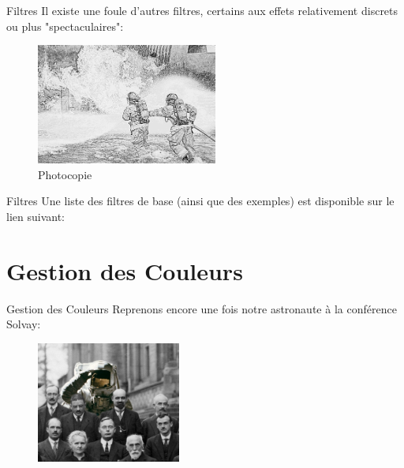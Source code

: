\documentclass[10pt,svgnames,usenames,table]{beamer}
\begin{document}
\begin{frame}{Filtres}
		Il existe une foule d'autres filtres, certains aux effets relativement discrets ou plus "spectaculaires":
		
		\begin{figure}[H]
			\centering
				\includegraphics[height=150px]{Images/filters/photocopy} 
				\caption{Photocopie}
	\end{figure}		
	\end{frame}

\begin{frame}{Filtres}
	Une liste des filtres de base (ainsi que des exemples) est disponible sur le lien suivant:
	
	
	
\end{frame}



\section{Gestion des Couleurs}
	\begin{frame}{Gestion des Couleurs}
		Reprenons encore une fois notre astronaute à la conférence Solvay:

		\begin{figure}
			\centering
			\includegraphics[height=150px]{Images/colours/col1} 
		\end{figure}
	\end{frame}
	
\end{document}
